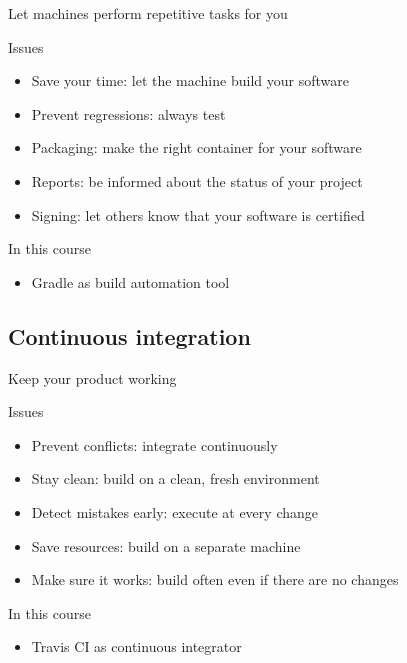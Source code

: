 \documentclass[presentation]{beamer}
\begin{document}
\begin{frame}{Let machines perform repetitive tasks for you}
    \begin{block}{Issues}
        \begin{itemize}
            \item Save your time: let the machine build your software
            \item Prevent regressions: always test
            \item Packaging: make the right container for your software
            \item Reports: be informed about the status of your project
            \item Signing: let others know that your software is certified
        \end{itemize}
    \end{block}
    \begin{block}{In this course}
        \begin{itemize}
            \item Gradle as build automation tool
        \end{itemize}
    \end{block}
\end{frame}

\subsection{Continuous integration}

\begin{frame}{Keep your product working}
    \begin{block}{Issues}
        \begin{itemize}
            \item Prevent conflicts: integrate continuously
            \item Stay clean: build on a clean, fresh environment
            \item Detect mistakes early: execute at every change
            \item Save resources: build on a separate machine
            \item Make sure it works: build often even if there are no changes
        \end{itemize}
    \end{block}
    \begin{block}{In this course}
        \begin{itemize}
            \item Travis CI as continuous integrator
        \end{itemize}
    \end{block}
\end{frame}
\end{document}
